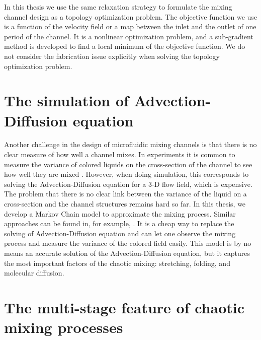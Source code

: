 In this thesis we use the same relaxation strategy to formulate the
mixing channel design as a topology optimization problem. The
objective function we use is a function of the velocity field or a map
between the inlet and the outlet of one period of the channel. It is a
nonlinear optimization problem, and a sub-gradient method is developed
to find a local minimum of the objective function. We do not
consider the fabrication issue explicitly when solving the topology
optimization problem.


\section{The simulation of Advection-Diffusion equation}
Another challenge in the design of microfluidic mixing channels is
that there is no clear measure of how well a channel mixes. In
experiments it is common to measure the variance of colored liquids on
the cross-section of the channel to see how well they are mixed
\cite{Stroock2002}. However, when doing simulation, this corresponds
to solving the Advection-Diffusion equation for a 3-D flow field, which
is expensive. The problem that there is no clear link between the
variance of the liquid on a cross-section and the channel structures
remains hard so far. In this thesis, we develop a Markov Chain model to
approximate the mixing process.  Similar approaches can be found in,
for example, \cite{Dellnitz1999, Dellnitz2002, Froyland1998,
Froyland1999, Froyland2001}. It is a cheap way to replace the solving
of Advection-Diffusion equation and can let one observe the mixing
process and measure the variance of the colored field easily. This
model is by no means an accurate solution of the Advection-Diffusion
equation, but it captures the most important factors of the chaotic
mixing: stretching, folding, and molecular diffusion.




\section{The multi-stage feature of chaotic mixing processes}

